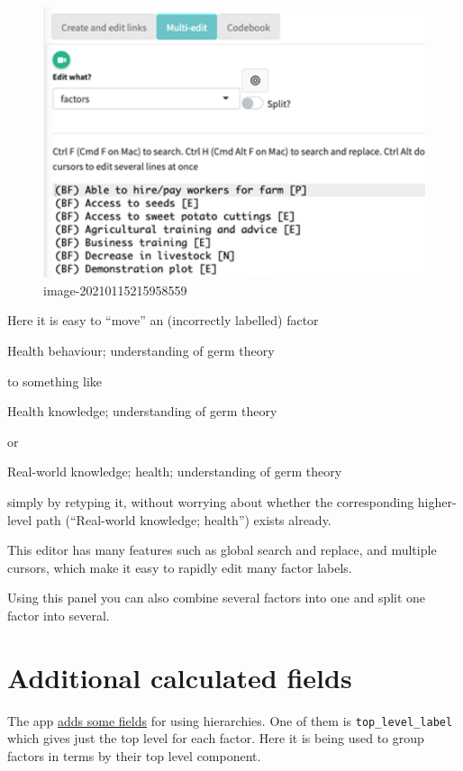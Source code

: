 \documentclass[
]{book}
\begin{document}
\begin{figure}
\centering
\includegraphics[width=6.77083in,height=\textheight]{_assets/image-20210115215958559.png}
\caption{image-20210115215958559}
\end{figure}

Here it is easy to ``move'' an (incorrectly labelled) factor

Health behaviour; understanding of germ theory

to something like

Health knowledge; understanding of germ theory

or

Real-world knowledge; health; understanding of germ theory

simply by retyping it, without worrying about whether the corresponding higher-level path (``Real-world knowledge; health'') exists already.

This editor has many features such as global search and replace, and multiple cursors, which make it easy to rapidly edit many factor labels.

Using this panel you can also combine several factors into one and split one factor into several.

\hypertarget{additional-calculated-fields}{%
\section{Additional calculated fields}\label{additional-calculated-fields}}

The app \protect\hyperlink{xcalculated-fields}{adds some fields} for using hierarchies. One of them is \texttt{top\_level\_label} which gives just the top level for each factor. Here it is being used to group factors in terms by their top level component.
\end{document}
